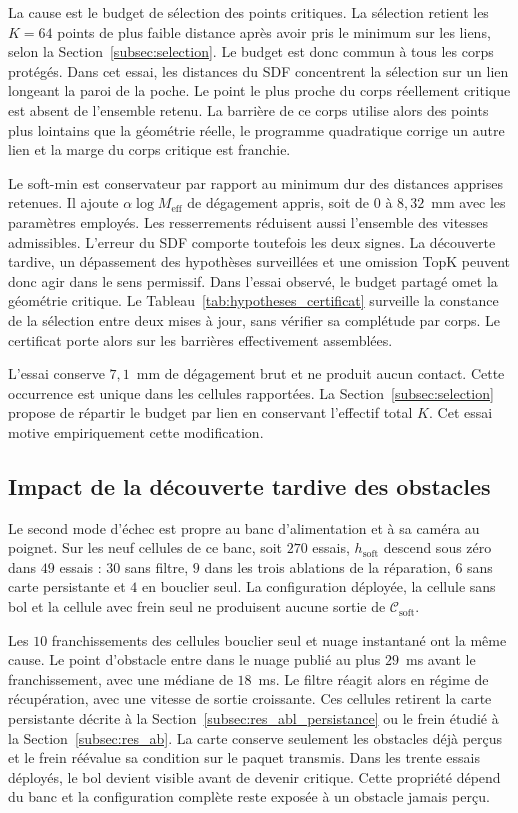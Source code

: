 La cause est le budget de sélection des points critiques. La sélection retient les $K=64$ points de plus faible distance après avoir pris le minimum sur les liens, selon la Section~\ref{subsec:selection}. Le budget est donc commun à tous les corps protégés. Dans cet essai, les distances du \ac{SDF} concentrent la sélection sur un lien longeant la paroi de la poche. Le point le plus proche du corps réellement critique est absent de l'ensemble retenu. La barrière de ce corps utilise alors des points plus lointains que la géométrie réelle, le programme quadratique corrige un autre lien et la marge du corps critique est franchie.

Le soft-min est conservateur par rapport au minimum dur des distances apprises retenues. Il ajoute $\alpha\log M_{\mathrm{eff}}$ de dégagement appris, soit de $0$ à $8{,}32$~mm avec les paramètres employés. Les resserrements réduisent aussi l'ensemble des vitesses admissibles. L'erreur du \ac{SDF} comporte toutefois les deux signes. La découverte tardive, un dépassement des hypothèses surveillées et une omission TopK peuvent donc agir dans le sens permissif. Dans l'essai observé, le budget partagé omet la géométrie critique. Le Tableau~\ref{tab:hypotheses_certificat} surveille la constance de la sélection entre deux mises à jour, sans vérifier sa complétude par corps. Le certificat porte alors sur les barrières effectivement assemblées.

L'essai conserve $7{,}1$~mm de dégagement brut et ne produit aucun contact. Cette occurrence est unique dans les cellules rapportées. La Section~\ref{subsec:selection} propose de répartir le budget par lien en conservant l'effectif total $K$. Cet essai motive empiriquement cette modification.

\subsection*{Impact de la découverte tardive des obstacles}
Le second mode d'échec est propre au banc d'alimentation et à sa caméra au poignet. Sur les neuf cellules de ce banc, soit $270$ essais, $h_{\mathrm{soft}}$ descend sous zéro dans $49$ essais : $30$ sans filtre, $9$ dans les trois ablations de la réparation, $6$ sans carte persistante et $4$ en bouclier seul. La configuration déployée, la cellule sans bol et la cellule avec frein seul ne produisent aucune sortie de $\mathcal{C}_{\mathrm{soft}}$.

Les $10$ franchissements des cellules bouclier seul et nuage instantané ont la même cause. Le point d'obstacle entre dans le nuage publié au plus $29$~ms avant le franchissement, avec une médiane de $18$~ms. Le filtre réagit alors en régime de récupération, avec une vitesse de sortie croissante. Ces cellules retirent la carte persistante décrite à la Section~\ref{subsec:res_abl_persistance} ou le frein étudié à la Section~\ref{subsec:res_ab}. La carte conserve seulement les obstacles déjà perçus et le frein réévalue sa condition sur le paquet transmis. Dans les trente essais déployés, le bol devient visible avant de devenir critique. Cette propriété dépend du banc et la configuration complète reste exposée à un obstacle jamais perçu.

